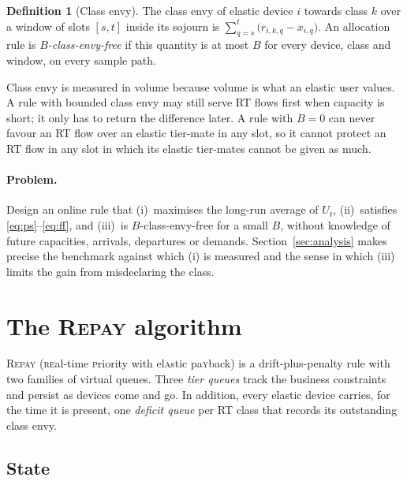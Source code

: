 \documentclass[preprint,11pt]{elsarticle}
\theoremstyle{definition}
\newtheorem{definition}{Definition}
\theoremstyle{remark}
\newcommand{\repay}{\textsc{Repay}}
\begin{document}
\begin{definition}[Class envy]\label{def:envy}
The class envy of elastic device $i$ towards class $k$ over a window of slots $[s,t]$ inside its sojourn is $\sum_{q=s}^{t}\big(r_{i,k,q}-x_{i,q}\big)$.
An allocation rule is \emph{$B$-class-envy-free} if this quantity is at most $B$ for every device, class and window, on every sample path.
\end{definition}

Class envy is measured in volume because volume is what an elastic user values.
A rule with bounded class envy may still serve RT flows first when capacity is short; it only has to return the difference later.
A rule with $B=0$ can never favour an RT flow over an elastic tier-mate in any slot, so it cannot protect an RT flow in any slot in which its elastic tier-mates cannot be given as much.

\paragraph{Problem.}
Design an online rule that (i)~maximises the long-run average of $U_t$, (ii)~satisfies \eqref{eq:ps}--\eqref{eq:ff}, and (iii)~is $B$-class-envy-free for a small $B$, without knowledge of future capacities, arrivals, departures or demands.
Section~\ref{sec:analysis} makes precise the benchmark against which (i) is measured and the sense in which (iii) limits the gain from misdeclaring the class.


\section{The \repay{} algorithm}\label{sec:algorithm}

\repay{} (\textsc{re}al-time \textsc{p}riority with el\textsc{a}stic pa\textsc{y}back) is a drift-plus-penalty rule with two families of virtual queues.
Three \emph{tier queues} track the business constraints and persist as devices come and go.
In addition, every elastic device carries, for the time it is present, one \emph{deficit queue} per RT class that records its outstanding class envy.

\subsection{State}
\end{document}
